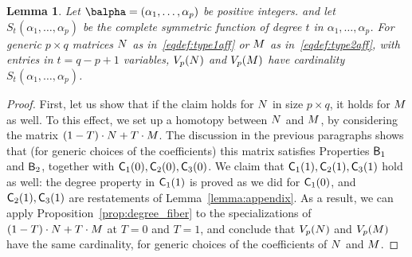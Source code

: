 \documentclass[12pt]{article}
\newtheorem{lemma}[definition]{Lemma}
\begin{document}
\begin{lemma}
  Let $\balpha=(\alpha_1,\dots,\alpha_p)$ be positive integers.  and
  let $S_{t}(\alpha_1,\dots,\alpha_p)$ be the complete symmetric
  function of degree $t$ in $\alpha_1,\dots,\alpha_p$. For generic $p
  \times q$ matrices ${N}$ as in~\eqref{eqdef:type1aff} or ${M}$ as
  in~\eqref{eqdef:type2aff}, with entries in $t=q-p+1$ variables,
$V_p({N})$ and $V_p({M})$ have
  cardinality $S_{t}(\alpha_1,\dots,\alpha_p)$.
\end{lemma}
\begin{proof}
  First, let us show that if the claim holds for ${N}$ in size $p
  \times q$, it holds for ${M}$ as well. To this effect, we set up a
  homotopy between ${N}$ and ${M}$, by considering the matrix
  $(1-T)\cdot{N} + T\cdot{M}$.  The discussion in the previous paragraphs shows
  that (for generic choices of the coefficients) this matrix satisfies
  Properties $\mathsf{B}_1$ and $\mathsf{B}_2$, together with
  $\mathsf{C}_1(0),\mathsf{C}_2(0),\mathsf{C}_3(0)$.  We claim that
  $\mathsf{C}_1(1),\mathsf{C}_2(1),\mathsf{C}_3(1)$ hold as well: the degree property
  in $\mathsf{C}_1(1)$ is proved as we did for $\mathsf{C}_1(0)$, and
  $\mathsf{C}_2(1),\mathsf{C}_3(1)$ are restatements of
  Lemma~\ref{lemma:appendix}. As a result, we can apply
  Proposition~\ref{prop:degree_fiber} to the specializations of
  $(1-T)\cdot{N} + T\cdot{M}$ at $T=0$ and $T=1$, and conclude that $V_p({N})$
  and $V_p({M})$ have the same cardinality, for generic choices of
  the coefficients of ${N}$ and ${M}$.


\end{proof}
\end{document}
